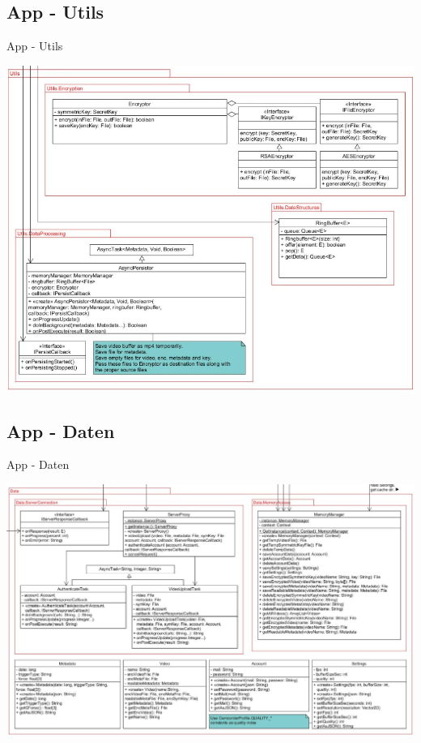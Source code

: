 \documentclass[19pt]{beamer}
\begin{document}
\subsection{App - Utils}
\begin{frame}{App - Utils}
\begin{center}
\includegraphics[scale=0.3]{resources/app_utils.png}
\end{center}
\end{frame}

\subsection{App - Daten}
\begin{frame}{App - Daten}
\begin{center}
\includegraphics[scale=0.25]{resources/app_data.png}
\end{center}
\end{frame}
\end{document}
